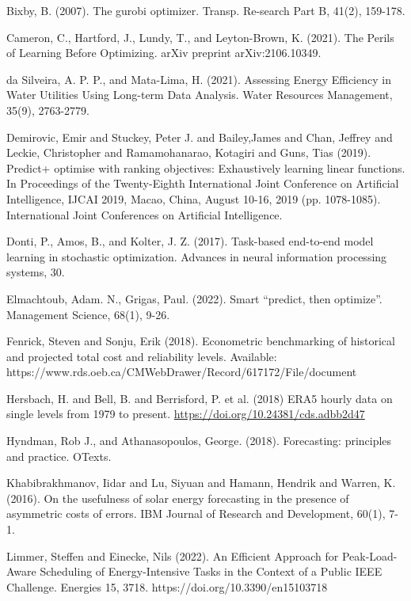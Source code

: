\documentclass[conference]{IEEEtran}
\begin{document}
\begin{thebibliography}{00}
 Bixby, B. (2007). The gurobi optimizer. Transp. Re-search Part B, 41(2), 159-178.

 Cameron, C., Hartford, J., Lundy, T., and Leyton-Brown, K. (2021). The Perils of Learning Before Optimizing. arXiv preprint arXiv:2106.10349.

 da Silveira, A. P. P., and Mata-Lima, H. (2021). Assessing Energy Efficiency in Water Utilities Using Long-term Data Analysis. Water Resources Management, 35(9), 2763-2779.

  Demirovic, Emir and  Stuckey, Peter J. and  Bailey,James and  Chan, Jeffrey and  Leckie, Christopher and  Ramamohanarao, Kotagiri and  Guns, Tias (2019). Predict+ optimise with ranking objectives: Exhaustively learning linear functions. In Proceedings of the Twenty-Eighth International Joint Conference on Artificial Intelligence, IJCAI 2019, Macao, China, August 10-16, 2019 (pp. 1078-1085). International Joint Conferences on Artificial Intelligence.

 Donti, P., Amos, B., and Kolter, J. Z. (2017). Task-based end-to-end model learning in stochastic optimization. Advances in neural information processing systems, 30.

 Elmachtoub, Adam. N.,  Grigas, Paul. (2022). Smart “predict, then optimize”. Management Science, 68(1), 9-26. 

 Fenrick, Steven and Sonju, Erik (2018). Econometric benchmarking of historical and projected total cost and reliability levels. Available: https://www.rds.oeb.ca/CMWebDrawer/Record/617172/File/document 

 Hersbach, H. and Bell, B. and Berrisford, P. et al. (2018)
{ERA5} hourly data on single levels from 1979 to present. \url{https://doi.org/10.24381/cds.adbb2d47}

 Hyndman, Rob J., and Athanasopoulos, George. (2018). Forecasting: principles and practice. OTexts.

 Khabibrakhmanov, Iidar and Lu, Siyuan and Hamann, Hendrik and Warren, K. (2016). On the usefulness of solar energy forecasting in the presence of asymmetric costs of errors. IBM Journal of Research and Development, 60(1), 7-1.

 Limmer, Steffen and Einecke, Nils (2022). An Efficient Approach for Peak-Load-Aware Scheduling of Energy-Intensive Tasks in the Context of a Public IEEE Challenge. Energies 15, 3718. https://doi.org/10.3390/en15103718


\end{thebibliography}
\end{document}
